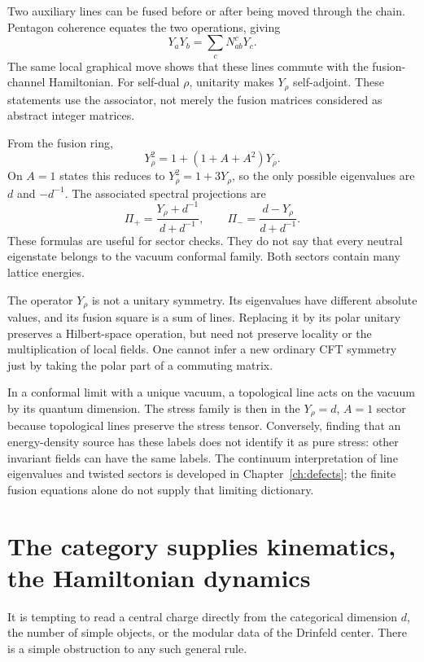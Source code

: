 Two auxiliary lines can be fused before or after being moved through the
chain. Pentagon coherence equates the two operations, giving
\[
 Y_aY_b=\sum_cN_{ab}^{c}Y_c.
\]
The same local graphical move shows that these lines commute with the
fusion-channel Hamiltonian. For self-dual $\rho$, unitarity makes
$Y_\rho$ self-adjoint. These statements use the associator, not merely
the fusion matrices considered as abstract integer matrices.

\begin{example}
From the fusion ring,
\[
 Y_\rho^2=1+(1+A+A^2)Y_\rho.
\]
On $A=1$ states this reduces to $Y_\rho^2=1+3Y_\rho$, so the only
possible eigenvalues are $d$ and $-d^{-1}$. The associated spectral
projections are
\[
 \Pi_+=\frac{Y_\rho+d^{-1}}{d+d^{-1}},\qquad
 \Pi_-=\frac{d-Y_\rho}{d+d^{-1}}.
\]
These formulas are useful for sector checks. They do not say that every
neutral eigenstate belongs to the vacuum conformal family. Both sectors
contain many lattice energies.
\end{example}

The operator $Y_\rho$ is not a unitary symmetry. Its eigenvalues have
different absolute values, and its fusion square is a sum of lines.
Replacing it by its polar unitary preserves a Hilbert-space operation,
but need not preserve locality or the multiplication of local fields.
One cannot infer a new ordinary CFT symmetry just by taking the polar
part of a commuting matrix.

In a conformal limit with a unique vacuum, a topological line acts on the
vacuum by its quantum dimension. The stress family is then in the
$Y_\rho=d$, $A=1$ sector because topological lines preserve the stress
tensor. Conversely, finding that an energy-density source has these
labels does not identify it as pure stress: other invariant fields can
have the same labels.
The continuum interpretation of line eigenvalues and twisted sectors
is developed in Chapter~\ref{ch:defects}; the finite fusion equations
alone do not supply that limiting dictionary.

\section{The category supplies kinematics, the Hamiltonian dynamics}

It is tempting to read a central charge directly from the categorical
dimension $d$, the number of simple objects, or the modular data of the
Drinfeld center. There is a simple obstruction to any such general rule.

